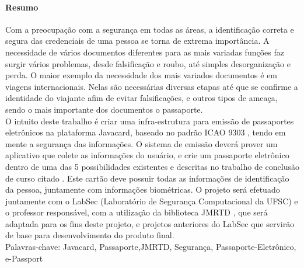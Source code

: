 \documentclass{article}
\begin{document}
	\paragraph{\large Resumo}
		\begin{flushleft}
			\hspace{2cm} Com a preocupação com a segurança em todas as áreas, a identificação correta e segura das credenciais de uma pessoa se torna de extrema importância. A necessidade de vários documentos diferentes para as mais variadas funções faz surgir vários problemas, desde falsificação e roubo, até simples desorganização e perda.
O maior exemplo da necessidade dos mais variados documentos é em viagens internacionais. Nelas são necessárias diversas etapas até que se confirme a identidade do viajante afim de evitar falsificações, e outros tipos de ameaça, sendo o mais importante dos documentos o passaporte.\\
			\hspace{2cm} O intuito deste trabalho é criar uma infra-estrutura para emissão de passaportes eletrônicos na plataforma Javacard, baseado no padrão ICAO 9303 \cite{ICAO}, tendo em mente a segurança das informações. O sistema de emissão deverá prover um aplicativo que colete as informações do usuário, e crie um passaporte eletrônico dentro de uma das 5 possibilidades existentes e descritas no trabalho de conclusão de curso citado \cite{SASSO}.
Este cartão deve possuir todas as informações de identificação da pessoa, juntamente com informações biométricas. 
O projeto será efetuado juntamente com o LabSec (Laboratório de Segurança Computacional da UFSC) e o professor responsável, com a utilização da biblioteca JMRTD \cite{JMRTD}, que será adaptada para os fins deste projeto, e projetos anteriores do LabSec que servirão de base para desenvolvimento do produto final. \\
	\vspace{10px}
Palavras-chave: Javacard, Passaporte,JMRTD, Segurança, Passaporte-Eletrônico, e-Passport
		\end{flushleft}
\end{document}
